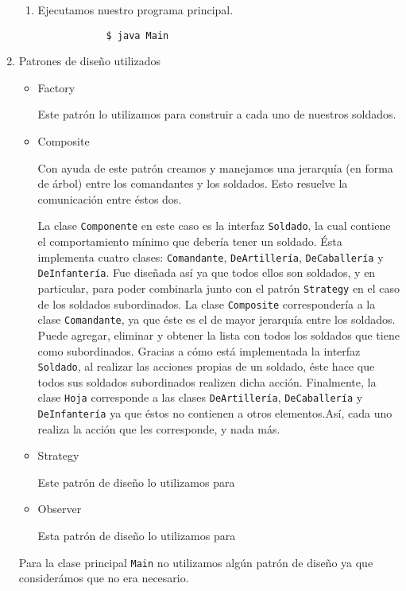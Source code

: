 \documentclass[letterpaper,11pt]{article}
\begin{document}
\begin{enumerate}
\begin{enumerate}
        \item Ejecutamos nuestro programa principal.
        \begin{verbatim}
            $ java Main 
        \end{verbatim}
    \end{enumerate}

    \item Patrones de diseño utilizados
    \begin{itemize}
        \item Factory
        
        Este patrón lo utilizamos para construir a cada uno de nuestros 
        soldados.

        \item Composite

        Con ayuda de este patrón creamos y manejamos una jerarquía (en forma 
        de árbol) entre los comandantes y los soldados. Esto resuelve la 
        comunicación entre éstos dos. 

        La clase \texttt{Componente} en este caso es la interfaz 
        \texttt{Soldado}, la cual contiene el comportamiento mínimo que debería 
        tener un soldado. Ésta implementa cuatro clases: \texttt{Comandante}, 
        \texttt{DeArtillería}, \texttt{DeCaballería} y \texttt{DeInfantería}. 
        Fue diseñada así ya que todos ellos son soldados, y en particular, para 
        poder combinarla junto con el patrón \texttt{Strategy} en el caso de 
        los soldados subordinados. La clase \texttt{Composite} correspondería a 
        la clase \texttt{Comandante}, ya que éste es el de mayor jerarquía entre 
        los soldados. Puede agregar, eliminar y obtener la lista con todos los 
        soldados que tiene como subordinados. Gracias a cómo está implementada
        la interfaz \texttt{Soldado}, al realizar las acciones propias de un 
        soldado, éste hace que todos sus soldados subordinados realizen dicha 
        acción. Finalmente, la clase \texttt{Hoja} corresponde a las clases 
        \texttt{DeArtillería}, \texttt{DeCaballería} y \texttt{DeInfantería}
        ya que éstos no contienen a otros elementos.Así, cada uno realiza 
        la acción que les corresponde, y nada más.

        \item Strategy 

        Este patrón de diseño lo utilizamos para 
        \item Observer 

        Esta patrón de diseño lo utilizamos para 
    \end{itemize}

    Para la clase principal \texttt{Main} no utilizamos algún patrón de diseño 
    ya que considerámos que no era necesario.
\end{enumerate}
\end{document}

